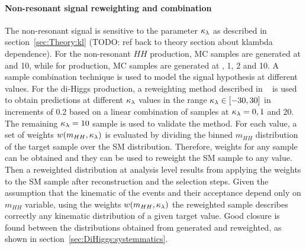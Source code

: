 \paragraph{Non-resonant signal reweighting and combination}
The non-resonant signal is sensitive to the parameter $\kappa_{\lambda}$ 
as described in section~\ref{sec:Theory:kl} 
(TODO: ref back to theory section about klambda dependence).
For the \ggH non-resonant $HH$ production, MC samples are generated at  and 10, 
while for \VBFH production, 
MC samples are generated at , 1, 2 and 10. 
A sample combination technique is used to model the signal hypothesis at different \kl values.
For the \ggH di-Higgs production, 
a reweighting method described in ~\cite{ATL-PHYS-PUB-2019-007} 
is used to obtain predictions at different $\kappa_{\lambda}$ values 
in the range $\kappa_{\lambda} \in \left[-30, 30 \right] $ 
in increments of 0.2 based on a linear combination of 
samples at $\kappa_{\lambda}=0, 1$ and 20. 
The remaining $\kappa_{\lambda} = 10$ sample is used to validate the method.
For each \kl value, a set of weights $w(m_{HH},\kappa_{\lambda})$ is evaluated 
by dividing the binned $m_{HH}$ distribution of the \kl target sample over the SM distribution. 
Therefore, weights for any \kl sample can be obtained and they can be used to reweight the SM sample to any \kl value. 
Then a reweighted distribution at analysis level results from 
applying the weights to the SM sample after reconstruction and the selection steps. 
Given the assumption that the kinematic of the \ggH events and their acceptance depend only on $m_{HH}$ variable, 
using the weights $w(m_{HH},\kappa_{\lambda})$ the reweighted sample describes correctly any kinematic distribution of a given target \kl value. 
Good closure is found between the distributions obtained from \kl generated and reweighted, 
as shown in section~\ref{sec:DiHiggs:systemmatics}.

